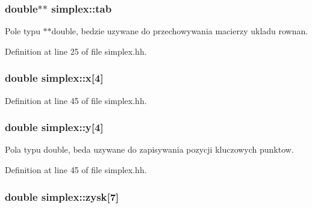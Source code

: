 \hypertarget{classsimplex_ac8767985af04610b7cbb310bb22a6f7c}{
\subsubsection[{tab}]{\setlength{\rightskip}{0pt plus 5cm}double$\ast$$\ast$ simplex\-::tab\hspace{0.3cm}{\ttfamily [private]}}}\label{classsimplex_ac8767985af04610b7cbb310bb22a6f7c}


Pole typu $\ast$$\ast$double, bedzie uzywane do przechowywania macierzy ukladu rownan. 



Definition at line 25 of file simplex.\-hh.

\hypertarget{classsimplex_ac0619d7747a373ff01bf3dab3126b330}{
\subsubsection[{x}]{\setlength{\rightskip}{0pt plus 5cm}double simplex\-::x\mbox{[}4\mbox{]}\hspace{0.3cm}{\ttfamily [private]}}}\label{classsimplex_ac0619d7747a373ff01bf3dab3126b330}


Definition at line 45 of file simplex.\-hh.

\hypertarget{classsimplex_abebe4828ea993bcfdb436a39123ce2c8}{
\subsubsection[{y}]{\setlength{\rightskip}{0pt plus 5cm}double simplex\-::y\mbox{[}4\mbox{]}\hspace{0.3cm}{\ttfamily [private]}}}\label{classsimplex_abebe4828ea993bcfdb436a39123ce2c8}


Pola typu double, beda uzywane do zapisywania pozycji kluczowych punktow. 



Definition at line 45 of file simplex.\-hh.

\hypertarget{classsimplex_a08631fd56f6f55fb022860ee5edcbdf4}{
\subsubsection[{zysk}]{\setlength{\rightskip}{0pt plus 5cm}double simplex\-::zysk\mbox{[}7\mbox{]}\hspace{0.3cm}{\ttfamily [private]}}}\label{classsimplex_a08631fd56f6f55fb022860ee5edcbdf4}


